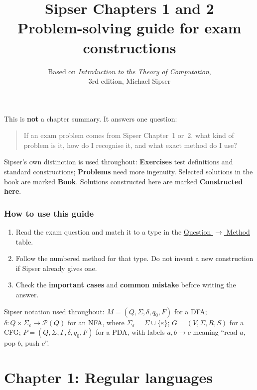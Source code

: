 \documentclass[11pt,a4paper]{article}
\title{\textbf{Sipser Chapters 1 and 2}\\[0.35em]
\large Problem-solving guide for exam constructions}
\author{Based on \emph{Introduction to the Theory of Computation},\\
3rd edition, Michael Sipser}
\date{}
\newcommand{\eps}{\varepsilon}
\newcommand{\powerset}[1]{\mathcal{P}(#1)}
\begin{document}
\maketitle

\noindent
This is \textbf{not} a chapter summary. It answers one question:

\begin{quote}
If an exam problem comes from Sipser Chapter~1 or~2, what kind of problem is
it, how do I recognise it, and what exact method do I use?
\end{quote}

Sipser's own distinction is used throughout: \textbf{Exercises} test definitions
and standard constructions; \textbf{Problems} need more ingenuity. Selected
solutions in the book are marked \textbf{Book}. Solutions constructed here are
marked \textbf{Constructed here}.

\tableofcontents
\newpage

\section*{How to use this guide}

\begin{enumerate}[leftmargin=1.4em]
  \item Read the exam question and match it to a type in the
        \hyperref[sec:quickref]{Question $\to$ Method} table.
  \item Follow the numbered method for that type. Do not invent a new
        construction if Sipser already gives one.
  \item Check the \textbf{important cases} and \textbf{common mistake}
        before writing the answer.
\end{enumerate}

Sipser notation used throughout:
$M=(Q,\Sigma,\delta,q_0,F)$ for a DFA;
$\delta:Q\times\Sigma_\eps\to\powerset{Q}$ for an NFA, where
$\Sigma_\eps=\Sigma\cup\{\eps\}$;
$G=(V,\Sigma,R,S)$ for a CFG;
$P=(Q,\Sigma,\Gamma,\delta,q_0,F)$ for a PDA, with labels
$a,b\to c$ meaning ``read $a$, pop $b$, push $c$''.

\part{Chapter 1: Regular languages}
\end{document}

